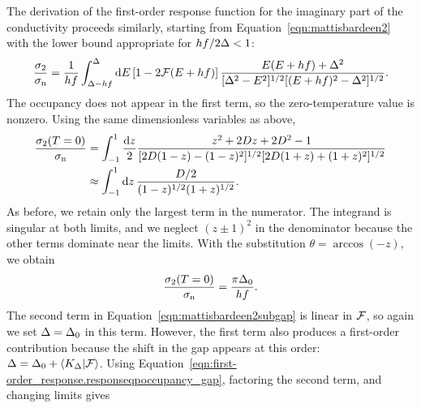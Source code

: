 The derivation of the first-order response function for the imaginary part of the conductivity proceeds similarly, starting from Equation~\ref{eqn:mattisbardeen2} with the lower bound appropriate for
$h f / 2 \Delta < 1$:
\begin{equation}
\frac{\sigma_2}{\sigma_{\mathrm{n}}}
  =
  \frac{1}{h f} \int_{\Delta - h f}^{\Delta} \dd{E}
  \left[ 1 - 2 \mathcal{F}(E + h f) \right]
  \frac{E (E + h f) + \Delta^2}
  {[\Delta^2 - E^2]^{1/2} [(E + h f)^2 - \Delta^2]^{1/2}}.
\label{eqn:mattisbardeen2subgap}
\end{equation}
The occupancy does not appear in the first term, so the zero-temperature value is nonzero.
Using the same dimensionless variables as above,
\begin{align}
\begin{split}
\frac{\sigma_2(T = 0)}{\sigma_{\mathrm{n}}}
  &=
  \int_{-1}^{1} \frac{\dd{z}}{2}
  \frac{z^2 + 2 D z + 2 D^2 - 1}{[2 D (1 - z) - (1 - z)^2]^{1/2} [2 D (1 + z) + (1 + z)^2]^{1/2}} \\
  &\approx
  \int_{-1}^{1} \dd{z}
  \frac{D / 2}{(1 - z)^{1/2} (1 + z)^{1/2}}.
\end{split}
\end{align}
As before, we retain only the largest term in the numerator.
The integrand is singular at both limits, and we neglect
$(z \pm 1)^2$
in the denominator because the other terms dominate near the limits.
With the substitution $\theta = \arccos(-z)$, we obtain
\begin{equation}
\frac{\sigma_2(T = 0)}{\sigma_{\mathrm{n}}}
  =
  \frac{\pi \Delta_0}{h f}.
\end{equation}
The second term in Equation~\ref{eqn:mattisbardeen2subgap} is linear in $\mathcal{F}$, so again we set $\Delta = \Delta_0$ in this term.
However, the first term also produces a first-order contribution because the shift in the gap appears at this order:
$\Delta = \Delta_0 + \braket{K_{\Delta}}{\mathcal{F}}$.
Using Equation~\ref{eqn:first-order_response.responseqpoccupancy_gap}, factoring the second term, and changing limits gives

